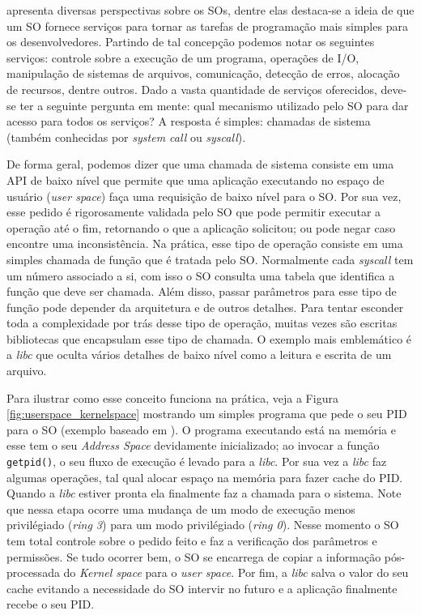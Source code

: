 \cite{silberschatz} apresenta diversas perspectivas sobre os SOs, dentre elas
destaca-se a ideia de que um SO fornece serviços para tornar as tarefas de
programação mais simples para os desenvolvedores. Partindo de tal concepção
podemos notar os seguintes serviços: controle sobre a execução de um programa,
operações de I/O, manipulação de sistemas de arquivos, comunicação, detecção de
erros, alocação de recursos, dentre outros. Dado a vasta quantidade de serviços
oferecidos, deve-se ter a seguinte pergunta em mente: qual mecanismo utilizado
pelo SO para dar acesso para todos os serviços? A resposta é simples: chamadas
de sistema (também conhecidas por \emph{system call} ou \emph{syscall}).

De forma geral, podemos dizer que uma chamada de sistema consiste em uma API de
baixo nível que permite que uma aplicação executando no espaço de usuário
(\emph{user space}) faça uma requisição de baixo nível para o SO. Por sua vez,
esse pedido é rigorosamente validada pelo SO que pode permitir executar a
operação até o fim, retornando o que a aplicação solicitou; ou pode negar caso
encontre uma inconsistência. Na prática, esse tipo de operação consiste em uma
simples chamada de função que é tratada pelo SO. Normalmente cada
\emph{syscall} tem um número associado a si, com isso o SO consulta uma tabela
que identifica a função que deve ser chamada. Além disso, passar parâmetros
para esse tipo de função pode depender da arquitetura e de outros detalhes.
Para tentar esconder toda a complexidade por trás desse tipo de operação,
muitas vezes são escritas bibliotecas que encapsulam esse tipo de chamada. O
exemplo mais emblemático é a \emph{libc} que oculta vários detalhes de baixo
nível como a leitura e escrita de um arquivo.

Para ilustrar como esse conceito funciona na prática, veja a Figura
\ref{fig:userspace_kernelspace} mostrando um simples programa que pede o seu
PID para o SO (exemplo baseado em \cite{syscallex}). O programa executando está
na memória e esse tem o seu \emph{Address Space} devidamente inicializado; ao
invocar a função \texttt{getpid()}, o seu fluxo de execução é levado para a
\emph{libc}. Por sua vez a \emph{libc} faz algumas operações, tal qual alocar
espaço na memória para fazer cache do PID. Quando a \emph{libc} estiver pronta
ela finalmente faz a chamada para o sistema. Note que nessa etapa ocorre uma
mudança de um modo de execução menos privilégiado (\emph{ring 3}) para um modo
privilégiado (\emph{ring 0}). Nesse momento o SO tem total controle sobre o
pedido feito e faz a verificação dos parâmetros e permissões. Se tudo ocorrer
bem, o SO se encarrega de copiar a informação pós-processada do \emph{Kernel
space} para o \emph{user space}. Por fim, a \emph{libc} salva o valor do seu
cache evitando a necessidade do SO intervir no futuro e a aplicação finalmente
recebe o seu PID.

